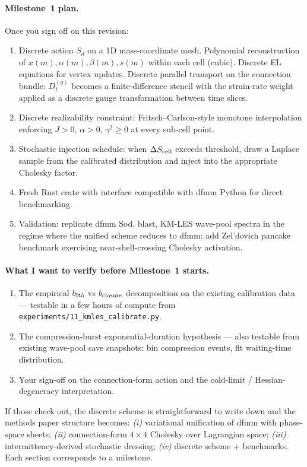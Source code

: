 \documentclass[11pt]{article}
\begin{document}
\paragraph{Milestone~1 plan.} Once you sign off on this revision:
\begin{enumerate}
\item Discrete action $S_d$ on a 1D mass-coordinate mesh.
Polynomial reconstruction of $x(m), \alpha(m), \beta(m), s(m)$ within
each cell (cubic). Discrete EL equations for vertex updates. Discrete
parallel transport on the connection bundle: $D_t^{(q)}$ becomes a
finite-difference stencil with the strain-rate weight applied as a
discrete gauge transformation between time slices.
\item Discrete realizability constraint: Fritsch--Carlson-style monotone
interpolation enforcing $J > 0$, $\alpha > 0$, $\gamma^2 \geq 0$ at every
sub-cell point.
\item Stochastic injection schedule: when $\Delta S_{\rm cell}$ exceeds
threshold, draw a Laplace sample from the calibrated distribution and
inject into the appropriate Cholesky factor.
\item Fresh Rust crate with interface compatible with dfmm Python for
direct benchmarking.
\item Validation: replicate dfmm Sod, blast, KM-LES wave-pool spectra in
the regime where the unified scheme reduces to dfmm; add Zel'dovich
pancake benchmark exercising near-shell-crossing Cholesky activation.
\end{enumerate}

\paragraph{What I want to verify before Milestone~1 starts.}
\begin{enumerate}
\item The empirical $b_{\rm It\hat o}$ vs $b_{\rm closure}$ decomposition
on the existing calibration data --- testable in a few hours of compute
from \verb|experiments/11_kmles_calibrate.py|.
\item The compression-burst exponential-duration hypothesis --- also
testable from existing wave-pool save snapshots: bin compression events,
fit waiting-time distribution.
\item Your sign-off on the connection-form action and the cold-limit /
Hessian-degeneracy interpretation.
\end{enumerate}

If those check out, the discrete scheme is straightforward to write down
and the methods paper structure becomes: \emph{(i)} variational
unification of dfmm with phase-space sheets; \emph{(ii)} connection-form
$4\times 4$ Cholesky over Lagrangian space; \emph{(iii)} intermittency-derived
stochastic dressing; \emph{(iv)} discrete scheme + benchmarks. Each
section corresponds to a milestone.
\end{document}
